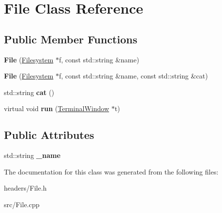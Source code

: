 \hypertarget{class_file}{}\section{File Class Reference}
\label{class_file}
\subsection*{Public Member Functions}
\begin{DoxyCompactItemize}
\item 
\hypertarget{class_file_a69d092c3f2d97377d5b62447b8cbf884}{}\label{class_file_a69d092c3f2d97377d5b62447b8cbf884} 
{\bfseries File} (\hyperlink{class_filesystem}{Filesystem} $\ast$f, const std\+::string \&name)
\item 
\hypertarget{class_file_a209295d716a644c786a8766922f59905}{}\label{class_file_a209295d716a644c786a8766922f59905} 
{\bfseries File} (\hyperlink{class_filesystem}{Filesystem} $\ast$f, const std\+::string \&name, const std\+::string \&cat)
\item 
\hypertarget{class_file_aa041ad660c8322eecb72333a80bd1c48}{}\label{class_file_aa041ad660c8322eecb72333a80bd1c48} 
std\+::string {\bfseries cat} ()
\item 
\hypertarget{class_file_a479b1c28c7ad57ccf1e76b8305221a64}{}\label{class_file_a479b1c28c7ad57ccf1e76b8305221a64} 
virtual void {\bfseries run} (\hyperlink{class_terminal_window}{Terminal\+Window} $\ast$t)
\end{DoxyCompactItemize}
\subsection*{Public Attributes}
\begin{DoxyCompactItemize}
\item 
\hypertarget{class_file_a94e032201b6182d92d0eadbea43182ac}{}\label{class_file_a94e032201b6182d92d0eadbea43182ac} 
std\+::string {\bfseries \+\_\+name}
\end{DoxyCompactItemize}


The documentation for this class was generated from the following files\+:\begin{DoxyCompactItemize}
\item 
headers/File.\+h\item 
src/File.\+cpp\end{DoxyCompactItemize}
